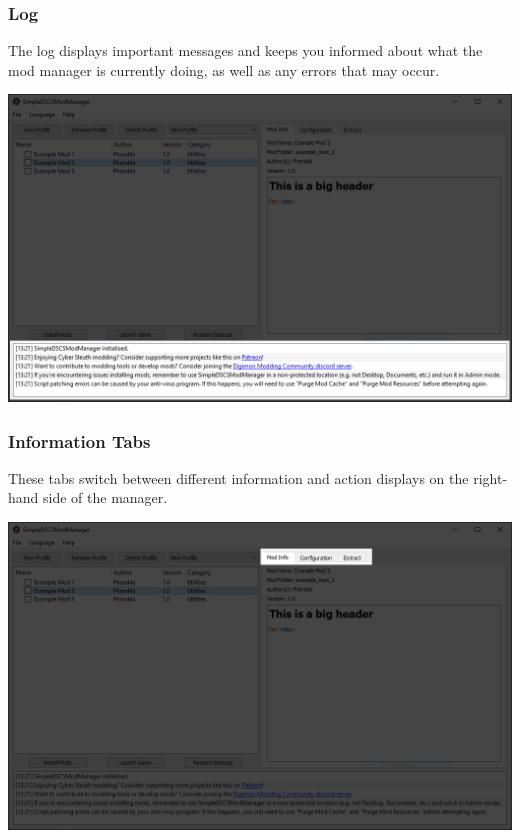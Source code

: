 \documentclass{article}
\begin{document}
\subsubsection{Log}
The log displays important messages and keeps you informed about what the mod manager is currently doing, as well as any errors that may occur.
\begin{center}
  \includegraphics[scale=0.4]{img/modmanager_ui_log.jpg}
\end{center}
\newpage
\subsubsection{Information Tabs}
These tabs switch between different information and action displays on the right-hand side of the manager.\begin{center}
  \includegraphics[scale=0.4]{img/modmanager_ui_infotabs.jpg}
\end{center}
\end{document}
